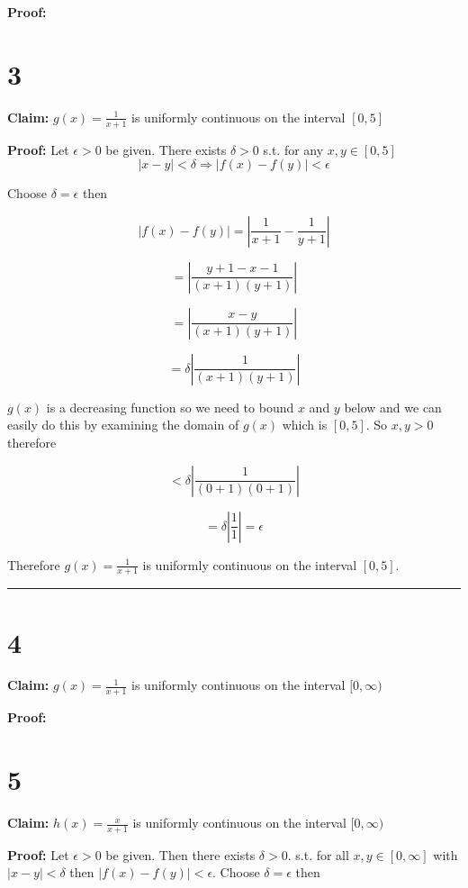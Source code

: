 \documentclass[10pt,letterpaper]{article}
\newcommand\qedsym{\hfill \rule{2mm}{2mm}}
\begin{document}
\textbf{Proof:}

\section*{3}

\textbf{Claim:} $g(x) = \frac{1}{x+1}$ is uniformly continuous on the interval $[0,5]$

\medskip

\textbf{Proof:} Let $\epsilon > 0$ be given. There exists $\delta > 0$ s.t. for any $x, y \in [0,5]$ \[|x-y| < \delta \Rightarrow |f(x) - f(y)| < \epsilon\]

Choose $\delta = \epsilon$ then

\[|f(x) - f(y)| = \left|\frac{1}{x+1} - \frac{1}{y+1}\right|\]

\[ = \left|\frac{y+1-x-1}{(x+1)(y+1)}\right|\]

\[ = \left|\frac{x-y}{(x+1)(y+1)}\right|\]

\[ = \delta\left|\frac{1}{(x+1)(y+1)}\right|\]

$g(x)$ is a decreasing function so we need to bound $x$ and $y$ below and we can easily do this by examining the domain of $g(x)$ which is $[0,5]$. So $x,y > 0$ therefore 

\[ < \delta\left|\frac{1}{(0+1)(0+1)}\right|\]

\[ = \delta\left|\frac{1}{1}\right| = \epsilon\]

Therefore $g(x) = \frac{1}{x+1}$ is uniformly continuous on the interval $[0,5]$.

\qedsym

\section*{4}

\textbf{Claim:} $g(x) = \frac{1}{x+1}$ is uniformly continuous on the interval $[0,\infty)$

\medskip

\textbf{Proof:} 

\section*{5}

\textbf{Claim:} $h(x) = \frac{x}{x+1}$ is uniformly continuous on the interval $[0, \infty)$

\medskip

\textbf{Proof:} Let $\epsilon > 0$ be given. Then there exists $\delta > 0$. s.t. for all $x,y\in[0,\infty]$ with $|x-y|<\delta$ then $|f(x)-f(y)| < \epsilon$. Choose $\delta = \epsilon$ then
\end{document}
